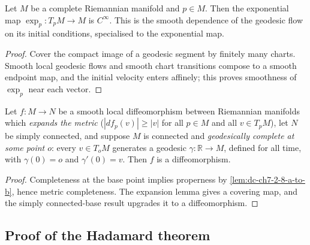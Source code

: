 \begin{lemma}

  \label{lem:dc-ch7-3-expmap-smooth}


Let $M$ be a complete Riemannian manifold and $p\in M$. Then the exponential map
  $\exp_p:T_pM\to M$ is $C^\infty$. This is the smooth dependence of the geodesic flow on its
  initial conditions, specialised to the exponential map.
\end{lemma}
\begin{proof}


\sketch Cover the compact image of a geodesic segment by finitely many charts. Smooth local geodesic flows and smooth chart transitions compose to a smooth endpoint map, and the initial velocity enters affinely; this proves smoothness of $\exp_p$ near each vector.
\end{proof}

\begin{lemma}

  \label{lem:dc-ch7-3-1-assembly}


Let $f:M\to N$ be a smooth local diffeomorphism between Riemannian manifolds which
  \emph{expands the metric} ($|df_p(v)|\ge|v|$ for all $p\in M$ and all $v\in T_pM$), let
  $N$ be simply connected, and suppose $M$ is connected and \emph{geodesically complete at
  some point $o$}: every $v\in T_oM$ generates a geodesic $\gamma:\mathbb R\to M$, defined
  for all time, with $\gamma(0)=o$ and $\gamma'(0)=v$. Then $f$ is a diffeomorphism.
\end{lemma}
\begin{proof}


\sketch Completeness at the base point implies properness by \cref{lem:dc-ch7-2-8-a-to-b}, hence metric completeness. The expansion lemma gives a covering map, and the simply connected-base result upgrades it to a diffeomorphism.
\end{proof}

\subsection{Proof of the Hadamard theorem}

